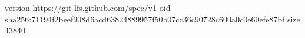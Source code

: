 version https://git-lfs.github.com/spec/v1
oid sha256:71194f2beef908d6acd63824889957f50b07cc36c90728c600a0c0e60efe87bf
size 43840
